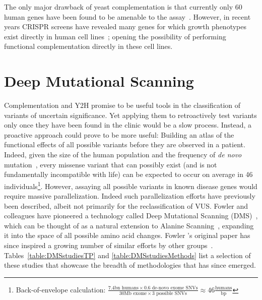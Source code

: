 The only major drawback of yeast complementation is that currently only 60 human genes have been found to be amenable to the assay~\cite{sun_extended_2016}. However, in recent years CRISPR screens have revealed many genes for which growth phenotypes exist directly in human cell lines~\cite{hart_high-resolution_2015,blomen_gene_2015,wang_genetic_2014}; opening the possibility of performing functional complementation directly in these cell lines.


\section{Deep Mutational Scanning}
\label{dmsIntro}

Complementation and Y2H promise to be useful tools in the classification of variants of uncertain significance. Yet applying them to retroactively test variants only once they have been found in the clinic would be a slow process. Instead, a proactive approach could prove to be more useful: Building an atlas of the functional effects of all possible variants before they are observed in a patient. Indeed, given the size of the human population and the frequency of \textit{de novo} mutation~\cite{acuna-hidalgo_new_2016}, every missense variant that can possibly exist (and is not fundamentally incompatible with life) can be expected to occur on average in 46 individuals\footnote{Back-of-envelope calculation: $\frac{7.4 \text{bn humans} \times 0.6 \text{ de-novo exome SNVs}}{30\text{Mb exome} \times 3 \text{ possible SNVs}} \approx 46\frac{\text{humans}}{\text{bp}}$}. However, assaying all possible variants in known disease genes would require massive parallelization. Indeed such parallelization efforts have previously been described, albeit not primarily for the reclassification of VUS. Fowler and colleagues have pioneered a technology called Deep Mutational Scanning (DMS)~\cite{fowler_high-resolution_2010}, which can be thought of as a natural extension to Alanine Scanning~\cite{cunningham_high-resolution_1989}, expanding it into the space of all possible amino acid changes. Fowler \etal's original paper has since inspired a growing number of similar efforts by other groups~\cite{ernst_coevolution_2010,hietpas_experimental_2011,fujino_robust_2012,adkar_protein_2012,mclaughlin_jr_spatial_2012,schlinkmann_critical_2012,whitehead_optimization_2012,traxlmayr_construction_2012,wu_systematic_2013,roscoe_analyses_2013,starita_activity-enhancing_2013,procko_computational_2013,tinberg_computational_2013,jiang_latent_2013,kim_high-throughput_2013,melamed_deep_2013,forsyth_deep_2013,wagenaar_resistance_2014,firnberg_comprehensive_2014,olson_comprehensive_2014,melnikov_comprehensive_2014,bloom_experimentally_2014,thyagarajan_inherent_2014,stiffler_evolvability_2015,doud_site-specific_2015,kitzman_massively_2015,starita_massively_2015,mishra_systematic_2016,doud_accurate_2016,mavor_determination_2016,majithia_prospective_2016}. Tables~\ref{table:DMSstudiesTP} and \ref{table:DMSstudiesMethods} list a selection of these studies that showcase the breadth of methodologies that has since emerged. 
